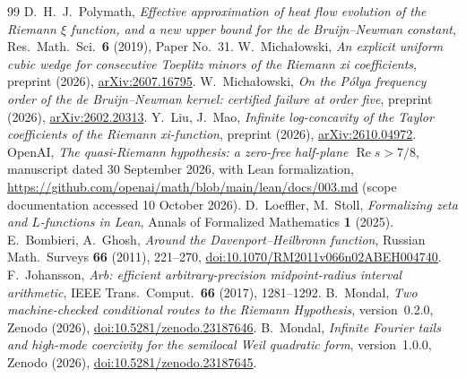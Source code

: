 \documentclass[11pt]{article}
\theoremstyle{plain}
\theoremstyle{definition}
\theoremstyle{remark}
\DeclareMathOperator{\re}{Re}
\begin{document}
\begin{thebibliography}{99}
 D.~H.~J.~Polymath, \emph{Effective approximation of heat flow
evolution of the Riemann $\xi$ function, and a new upper bound for the de
Bruijn--Newman constant}, Res.\ Math.\ Sci.\ \textbf{6} (2019), Paper No.~31.
 W.~Micha\l{}owski, \emph{An explicit uniform cubic wedge
for consecutive Toeplitz minors of the Riemann xi coefficients}, preprint (2026),
\href{https://arxiv.org/abs/2607.16795}{arXiv:2607.16795}.
 W.~Micha\l{}owski, \emph{On the Pólya frequency order of the
de Bruijn--Newman kernel: certified failure at order five}, preprint (2026),
\href{https://arxiv.org/abs/2602.20313}{arXiv:2602.20313}.
 Y.~Liu, J.~Mao, \emph{Infinite log-concavity of the Taylor
coefficients of the Riemann xi-function}, preprint (2026),
\href{https://arxiv.org/abs/2610.04972}{arXiv:2610.04972}.
 OpenAI, \emph{The quasi-Riemann hypothesis: a zero-free
half-plane $\re s>7/8$}, manuscript dated 30 September 2026, with Lean formalization,
\url{https://github.com/openai/math/blob/main/lean/docs/003.md}
(scope documentation accessed 10 October 2026).
 D.~Loeffler, M.~Stoll, \emph{Formalizing zeta and
$L$-functions in Lean}, Annals of Formalized Mathematics \textbf{1} (2025).
 E.~Bombieri, A.~Ghosh,
\emph{Around the Davenport--Heilbronn function},
Russian Math.\ Surveys \textbf{66} (2011), 221--270,
\href{https://doi.org/10.1070/RM2011v066n02ABEH004740}{doi:10.1070/RM2011v066n02ABEH004740}.
 F.~Johansson, \emph{Arb: efficient arbitrary-precision
midpoint-radius interval arithmetic}, IEEE Trans.\ Comput.\ \textbf{66} (2017),
1281--1292.
 B.~Mondal, \emph{Two machine-checked conditional routes
to the Riemann Hypothesis}, version~0.2.0, Zenodo (2026),
\href{https://doi.org/10.5281/zenodo.23187646}{doi:10.5281/zenodo.23187646}.
 B.~Mondal, \emph{Infinite Fourier tails and high-mode
coercivity for the semilocal Weil quadratic form}, version~1.0.0, Zenodo (2026),
\href{https://doi.org/10.5281/zenodo.23187645}{doi:10.5281/zenodo.23187645}.
\end{thebibliography}
\end{document}
